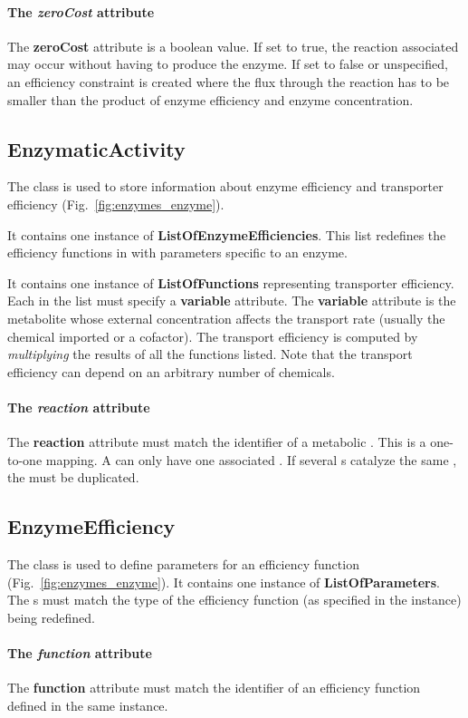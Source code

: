 \paragraph{The \textit{zeroCost} attribute}
The \textbf{zeroCost} attribute is a boolean value.
If set to true, the reaction associated may occur without having to produce
the enzyme.
If set to false or unspecified, an efficiency constraint is created where the
flux through the reaction has to be smaller than the product of enzyme
efficiency and enzyme concentration.


\subsection{EnzymaticActivity}
\label{sec:enzymatic_activity}

The \enzymaticactivity{} class is used to store information about
enzyme efficiency and transporter efficiency (Fig.~\ref{fig:enzymes_enzyme}).

It contains one instance of \textbf{ListOfEnzymeEfficiencies}.
This list redefines the efficiency functions in \rbaenzymes{}
with parameters specific to an enzyme.

It contains one instance of \textbf{ListOfFunctions} representing
transporter efficiency.
Each \function{} in the list must specify a \textbf{variable} attribute.
The \textbf{variable} attribute is the metabolite whose external concentration
affects the transport rate (usually the chemical imported or a cofactor).
The transport efficiency is computed by \emph{multiplying} the results
of all the functions listed.
Note that the transport efficiency can depend on an arbitrary number of
chemicals.

\paragraph{The \textit{reaction} attribute}
The \textbf{reaction} attribute must match the identifier of a metabolic
\reaction.
This is a one-to-one mapping.
A \reaction{} can only have one associated \enzyme{}.
If several \enzyme{}s catalyze the same \reaction{},
the \reaction{} must be duplicated.


\subsection{EnzymeEfficiency}
\label{sec:enzyme_efficiency}

The \enzymeefficiency{} class is used to define parameters
for an efficiency function (Fig.~\ref{fig:enzymes_enzyme}).
It contains one instance of \textbf{ListOfParameters}.
The \parameter{}s must match the type of the efficiency function
(as specified in the \rbaenzymes{} instance) being redefined.

\paragraph{The \textit{function} attribute}
The \textbf{function} attribute must match the identifier of an efficiency
function defined in the same \rbaenzymes{} instance.
